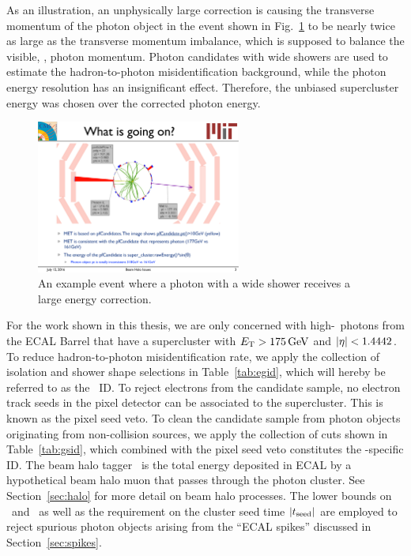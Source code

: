 As an illustration, an unphysically large correction is causing the transverse momentum of the photon object in the event shown in Fig.~\ref{fig:badcorr_evtdisp} to be nearly twice as large as the transverse momentum imbalance, which is supposed to balance the visible, \ie, photon momentum. 
Photon candidates with wide showers are used to estimate the hadron-to-photon misidentification background, while the photon energy resolution has an insignificant effect. 
Therefore, the unbiased supercluster energy was chosen over the corrected photon energy.

\begin{figure}[htbp]
  \begin{center}
    \includegraphics[width=0.6\textwidth]{Reconstruction/Figures/badcorr_evtdisp.pdf}
    \caption{
      An example event where a photon with a wide shower receives a large energy correction.
    }
    \label{fig:badcorr_evtdisp}
  \end{center}
\end{figure}

For the work shown in this thesis, we are only concerned with high-\ET\ photons from the ECAL Barrel that have a supercluster with $E_{\mathrm{T}} > 175\,\text{Ge\hspace{-.08em}V}$ and $\lvert \eta \rvert < 1.4442$. 
To reduce hadron-to-photon misidentification rate, we apply the collection of isolation and shower shape selections in Table~\ref{tab:egid}, which will hereby be referred to as the \egamma\ ID.
To reject electrons from the candidate sample, no electron track seeds in the pixel detector can be associated to the supercluster.
This is known as the pixel seed veto.
To clean the candidate sample from photon objects originating from non-collision sources, we apply the collection of cuts shown in Table~\ref{tab:gsid}, which combined with the pixel seed veto constitutes the \Pgg-specific ID.
The beam halo tagger \emip\ is the total energy deposited in ECAL by a hypothetical beam halo muon that passes through the photon cluster. See Section~\ref{sec:halo} for more detail on beam halo processes. 
The lower bounds on \sieie\ and \sipip\ as well as the requirement on the cluster seed time $\lvert t_{\text{seed}} \rvert$ are employed to reject spurious photon objects arising from the ``ECAL spikes'' discussed in Section~\ref{sec:spikes}.

